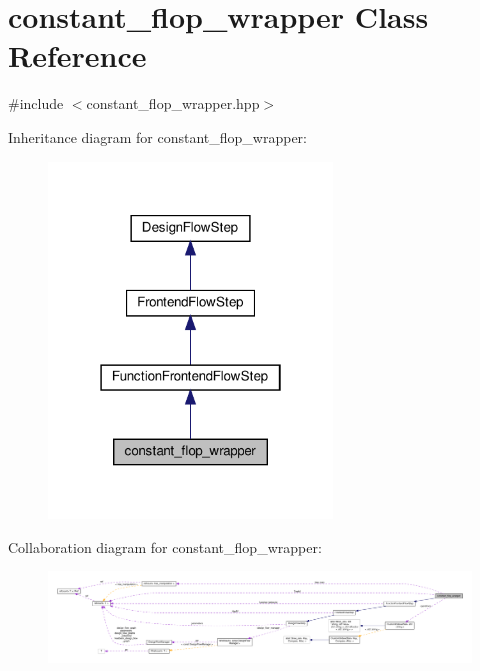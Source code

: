 \hypertarget{classconstant__flop__wrapper}{}\section{constant\+\_\+flop\+\_\+wrapper Class Reference}
\label{classconstant__flop__wrapper}


{\ttfamily \#include $<$constant\+\_\+flop\+\_\+wrapper.\+hpp$>$}



Inheritance diagram for constant\+\_\+flop\+\_\+wrapper\+:
\nopagebreak
\begin{figure}[H]
\begin{center}
\leavevmode
\includegraphics[width=214pt]{dd/d21/classconstant__flop__wrapper__inherit__graph}
\end{center}
\end{figure}


Collaboration diagram for constant\+\_\+flop\+\_\+wrapper\+:
\nopagebreak
\begin{figure}[H]
\begin{center}
\leavevmode
\includegraphics[width=350pt]{dd/d1a/classconstant__flop__wrapper__coll__graph}
\end{center}
\end{figure}
